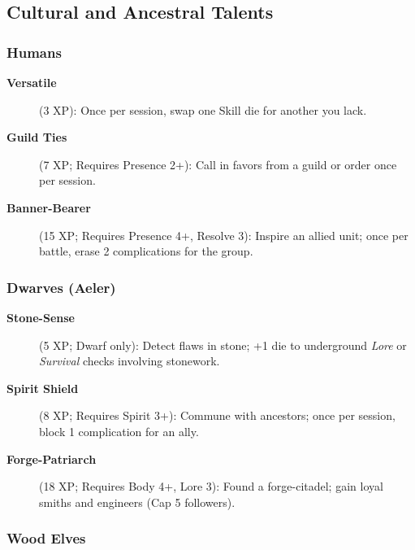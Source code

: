 \subsection{Cultural and Ancestral Talents}
\label{subsec:cultural-talents}

\subsubsection{Humans}
\label{subsubsec:human-talents}

\begin{description}
\item[\textbf{Versatile}] (3 XP): Once per session, swap one Skill die for another you lack.
\item[\textbf{Guild Ties}] (7 XP; Requires Presence 2+): Call in favors from a guild or order once per session.
\item[\textbf{Banner-Bearer}] (15 XP; Requires Presence 4+, Resolve 3): Inspire an allied unit; once per battle, erase 2 complications for the group.
\end{description}

\subsubsection{Dwarves (Aeler)}
\label{subsubsec:dwarf-talents}

\begin{description}
\item[\textbf{Stone-Sense}] (5 XP; Dwarf only): Detect flaws in stone; +1 die to underground \emph{Lore} or \emph{Survival} checks involving stonework.
\item[\textbf{Spirit Shield}] (8 XP; Requires Spirit 3+): Commune with ancestors; once per session, block 1 complication for an ally.
\item[\textbf{Forge-Patriarch}] (18 XP; Requires Body 4+, Lore 3): Found a forge-citadel; gain loyal smiths and engineers (Cap 5 followers).
\end{description}

\subsubsection{Wood Elves}
\label{subsubsec:wood-elf-talents}

